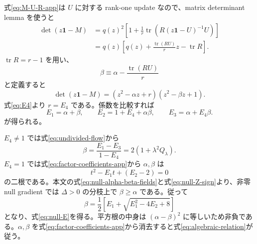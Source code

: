 \documentclass[a4paper,11pt]{ltjsarticle}
\numberwithin{equation}{section}
\newcommand{\tr}{\operatorname{tr}}
\newcommand{\Id}{\mathbf 1}
\begin{document}
式\eqref{eq:M-U-R-app}は $U$ に対する rank-one update なので、matrix determinant lemma を使うと
\begin{align}
 \det(z\Id-M)
 &=q(z)^2\left[1+\frac1r\tr\!\left(R(z\Id-U)^{-1}U\right)\right]\nonumber\\
 &=q(z)\left[q(z)+\frac{\tr(RU)}{r}z-\tr R\right].
 \label{eq:char-factor-intermediate-app}
\end{align}
$\tr R=r-1$ を用い、
\begin{equation}
 \beta\equiv\alpha-\frac{\tr(RU)}{r}
\end{equation}
と定義すると
\begin{equation}
 \det(z\Id-M)
 =(z^2-\alpha z+r)(z^2-\beta z+1).
 \label{eq:char-factor-app}
\end{equation}
式\eqref{eq:E4}より $r=E_4$ である。係数を比較すれば
\begin{equation}
 E_1=\alpha+\beta,
 \qquad
 E_2=1+E_4+\alpha\beta,
 \qquad
 E_3=\alpha+E_4\beta.
 \label{eq:factor-coefficients-app}
\end{equation}
が得られる。

$E_4\neq1$ では式\eqref{eq:undivided-flow}から
\begin{equation}
 \beta=\frac{E_1-E_3}{1-E_4}=2(1+\lambda^2Q_\lambda).
 \label{eq:beta-app}
\end{equation}
$E_4=1$ では式\eqref{eq:factor-coefficients-app}から $\alpha,\beta$ は
\begin{equation}
 t^2-E_1t+(E_2-2)=0
\end{equation}
の二根である。本文の式\eqref{eq:null-alpha-beta-fields}と式\eqref{eq:null-Z-sign}より、非零 null gradient では $\Delta>0$ の分枝上で $\beta\ge\alpha$ である。従って
\begin{equation}
 \beta=\frac12\left[E_1+\sqrt{E_1^2-4E_2+8}\right]
\end{equation}
となり、式\eqref{eq:null-E}を得る。平方根の中身は $(\alpha-\beta)^2$ に等しいため非負である。$\alpha,\beta$ を式\eqref{eq:factor-coefficients-app}から消去すると式\eqref{eq:algebraic-relation}が従う。
\end{document}
